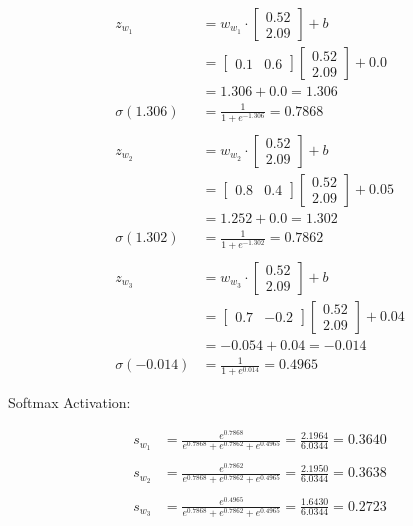 \documentclass[a4paper]{article}
\begin{document}
\begin{sloppypar}
\begin{enumerate}[start=1,label=Q\arabic*,left=0pt]
    \begin{align*}
        z_{w_1} &= w_{w_1} \cdot \begin{bmatrix} 0.52 \\ 2.09 \end{bmatrix} + b \\
        &= \begin{bmatrix}0.1 & 0.6\end{bmatrix} \begin{bmatrix} 0.52 \\ 2.09 \end{bmatrix} + 0.0 \\
        &= 1.306 + 0.0 = 1.306 \\
        \sigma(1.306) &= \frac{1}{1 + e^{-1.306}} = 0.7868 \\\\
        z_{w_2} &= w_{w_2} \cdot \begin{bmatrix} 0.52 \\ 2.09 \end{bmatrix} + b \\
        &= \begin{bmatrix}0.8 & 0.4\end{bmatrix} \begin{bmatrix} 0.52 \\ 2.09 \end{bmatrix} + 0.05 \\
        &= 1.252 + 0.0 = 1.302 \\
        \sigma(1.302) &= \frac{1}{1 + e^{-1.302}} = 0.7862 \\\\
        z_{w_3} &= w_{w_3} \cdot \begin{bmatrix} 0.52 \\ 2.09 \end{bmatrix} + b \\
        &= \begin{bmatrix}0.7 & -0.2\end{bmatrix} \begin{bmatrix} 0.52 \\ 2.09 \end{bmatrix} + 0.04 \\
        &= -0.054 + 0.04 = -0.014 \\
        \sigma(-0.014) &= \frac{1}{1 + e^{0.014}} = 0.4965
    \end{align*} 

    Softmax Activation:

    \begin{align*}
        s_{w_1} &= \frac{e^{0.7868}}{e^{0.7868} + e^{0.7862} + e^{0.4965}} = \frac{2.1964}{6.0344} = 0.3640 \\\\
        s_{w_2} &= \frac{e^{0.7862}}{e^{0.7868} + e^{0.7862} + e^{0.4965}} = \frac{2.1950}{6.0344} = 0.3638 \\\\
        s_{w_3} &= \frac{e^{0.4965}}{e^{0.7868} + e^{0.7862} + e^{0.4965}} = \frac{1.6430}{6.0344} = 0.2723 
    \end{align*} 


\end{enumerate}
\end{sloppypar}
\end{document}
